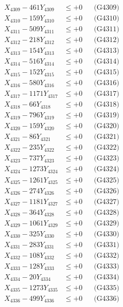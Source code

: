 \documentclass[a4paper,10pt]{article}
\begin{document}
{\begin{align}
X_{4309} - 461Y_{4309} &\leq +0 && \text{(G4309)} \\
X_{4310} - 159Y_{4310} &\leq +0 && \text{(G4310)} \\
\allowbreak
X_{4311} - 509Y_{4311} &\leq +0 && \text{(G4311)} \\
X_{4312} - 218Y_{4312} &\leq +0 && \text{(G4312)} \\
X_{4313} - 154Y_{4313} &\leq +0 && \text{(G4313)} \\
X_{4314} - 516Y_{4314} &\leq +0 && \text{(G4314)} \\
X_{4315} - 152Y_{4315} &\leq +0 && \text{(G4315)} \\
X_{4316} - 580Y_{4316} &\leq +0 && \text{(G4316)} \\
X_{4317} - 1171Y_{4317} &\leq +0 && \text{(G4317)} \\
X_{4318} - 66Y_{4318} &\leq +0 && \text{(G4318)} \\
X_{4319} - 796Y_{4319} &\leq +0 && \text{(G4319)} \\
X_{4320} - 159Y_{4320} &\leq +0 && \text{(G4320)} \\
\allowbreak
X_{4321} - 86Y_{4321} &\leq +0 && \text{(G4321)} \\
X_{4322} - 235Y_{4322} &\leq +0 && \text{(G4322)} \\
X_{4323} - 737Y_{4323} &\leq +0 && \text{(G4323)} \\
X_{4324} - 1273Y_{4324} &\leq +0 && \text{(G4324)} \\
X_{4325} - 1261Y_{4325} &\leq +0 && \text{(G4325)} \\
X_{4326} - 274Y_{4326} &\leq +0 && \text{(G4326)} \\
X_{4327} - 1181Y_{4327} &\leq +0 && \text{(G4327)} \\
X_{4328} - 364Y_{4328} &\leq +0 && \text{(G4328)} \\
X_{4329} - 1061Y_{4329} &\leq +0 && \text{(G4329)} \\
X_{4330} - 325Y_{4330} &\leq +0 && \text{(G4330)} \\
\allowbreak
X_{4331} - 283Y_{4331} &\leq +0 && \text{(G4331)} \\
X_{4332} - 108Y_{4332} &\leq +0 && \text{(G4332)} \\
X_{4333} - 128Y_{4333} &\leq +0 && \text{(G4333)} \\
X_{4334} - 20Y_{4334} &\leq +0 && \text{(G4334)} \\
X_{4335} - 1273Y_{4335} &\leq +0 && \text{(G4335)} \\
X_{4336} - 499Y_{4336} &\leq +0 && \text{(G4336)} \\

\end{align}}
\end{document}
